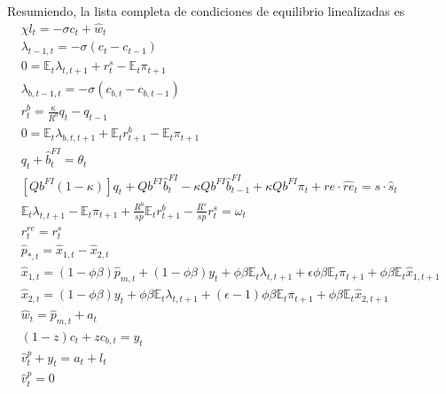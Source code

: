 \documentclass[../../entrega.tex]{subfiles}
\begin{document}
Resumiendo, la lista completa de condiciones de equilibrio linealizadas es
\begin{gather}
    \chi l_{t}=-\sigma c_{t}+\widehat{w}_{t} \label{eq:b-1} \tag{B.1}\\
    \lambda_{t-1, t}=-\sigma\left(c_{t}-c_{t-1}\right) \label{eq:b-2} \tag{B.2}\\
    0=\mathbb{E}_{t} \lambda_{t, t+1}+r_{t}^{s}-\mathbb{E}_{t} \pi_{t+1} \label{eq:b-3} \tag{B.3}\\
    \lambda_{b, t-1, t}=-\sigma\left(c_{b, t}-c_{b, t-1}\right) \label{eq:b-4} \tag{B.4}\\
    r_{t}^{b}=\frac{\kappa}{R^{b}} q_{t}-q_{t-1} \label{eq:b-5} \tag{B.5}\\
    0=\mathbb{E}_{t} \lambda_{b, t, t+1}+\mathbb{E}_{t} r_{t+1}^{b}-\mathbb{E}_{t} \pi_{t+1} \label{eq:b-6} \tag{B.6}\\
    q_{t}+\widehat{b}_{t}^{F I}=\theta_{t} \label{eq:b-7} \tag{B.7}\\
    {\left[Q b^{F I}(1-\kappa)\right] q_{t}+Q b^{F I} \widehat{b}_{t}^{F I}-\kappa Q b^{F I} \widehat{b}_{t-1}^{F I}+\kappa Q b^{F I} \pi_{t}+r e \cdot \widehat{r e}{ }_{t}=s \cdot \widehat{s}_{t}} \label{eq:b-8} \tag{B.8}\\
    \mathbb{E}_{t} \lambda_{t, t+1}-\mathbb{E}_{t} \pi_{t+1}+\frac{R^{b}}{s p} \mathbb{E}_{t} r_{t+1}^{b}-\frac{R^{s}}{s p} r_{t}^{s}=\omega_{t} \label{eq:b-9} \tag{B.9}\\
    r_{t}^{r e}=r_{t}^{s} \label{eq:b-10} \tag{B.10}\\
    \widehat{p}_{*, t}=\widehat{x}_{1, t}-\widehat{x}_{2, t} \label{eq:b-11} \tag{B.11}\\
    \widehat{x}_{1, t}=(1-\phi \beta) \widehat{p}_{m, t}+(1-\phi \beta) y_{t}+\phi \beta \mathbb{E}_{t} \lambda_{t, t+1}+\epsilon \phi \beta \mathbb{E}_{t} \pi_{t+1}+\phi \beta \mathbb{E}_{t} \widehat{x}_{1, t+1} \label{eq:b-12} \tag{B.12}\\
    \widehat{x}_{2, t}=(1-\phi \beta) y_{t}+\phi \beta \mathbb{E}_{t} \lambda_{t, t+1}+(\epsilon-1) \phi \beta \mathbb{E}_{t} \pi_{t+1}+\phi \beta \mathbb{E}_{t} \widehat{x}_{2, t+1} \label{eq:b-13} \tag{B.13}\\
    \widehat{w}_{t}=\widehat{p}_{m, t}+a_{t} \label{eq:b-14} \tag{B.14}\\
    (1-z) c_{t}+z c_{b, t}=y_{t} \label{eq:b-15} \tag{B.15}\\
    \widehat{v}_{t}^{p}+y_{t}=a_{t}+l_{t} \label{eq:b-16} \tag{B.16}\\
    \widehat{v}_{t}^{p}=0 \label{eq:b-17} \tag{B.17}\\

\end{gather}
\end{document}
